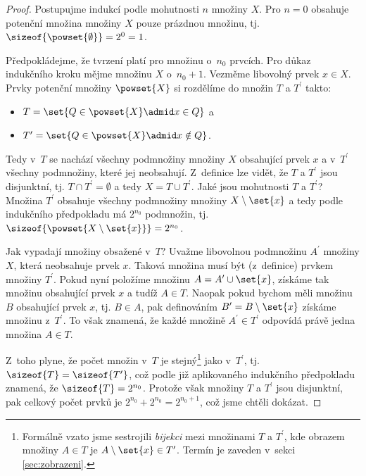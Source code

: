 \begin{proof}
    Postupujme indukcí podle mohutnosti $n$ množiny $X$. Pro $n=0$ obsahuje potenční množina množiny $X$ pouze prázdnou množinu, tj. $\sizeof{\powset{\emptyset}}=2^0=1$.\par
    Předpokládejme, že tvrzení platí pro množinu o~$n_0$ prvcích. Pro důkaz indukčního kroku mějme množinu $X$ o~$n_0+1$. Vezměme libovolný prvek $x \in X$. Prvky potenční množiny $\powset{X}$ si rozdělíme do množin $T$ a $T^\prime$ takto:
    \begin{itemize}
        \item $T=\set{Q \in \powset{X} \admid x\in Q}$ a
        \item $T^\prime=\set{Q \in \powset{X} \admid x\notin Q}$.
    \end{itemize}
    Tedy v~$T$ se nachází všechny podmnožiny množiny $X$ obsahující prvek $x$ a v~$T^\prime$ všechny podmnožiny, které jej neobsahují. Z~definice lze vidět, že $T$ a $T^\prime$ jsou disjunktní, tj. $T \cap T^\prime=\emptyset$ a tedy $X=T\cup T^\prime$. Jaké jsou mohutnosti $T$ a $T^\prime$? Množina $T^\prime$ obsahuje všechny podmnožiny množiny $X\setminus\set{x}$ a tedy podle indukčního předpokladu má $2^{n_0}$ podmnožin, tj. $\sizeof{\powset{X\setminus\set{x}}}=2^{n_0}$.\par
    Jak vypadají množiny obsažené v~$T$? Uvažme libovolnou podmnožinu $A^\prime$ množiny $X$, která neobsahuje prvek $x$. Taková množina musí být (z~definice) prvkem množiny $T^\prime$. Pokud nyní položíme množinu $A=A^\prime\cup \set{x}$, získáme tak množinu obsahující prvek $x$ a tudíž $A\in T$. Naopak pokud bychom měli množinu $B$ obsahující prvek $x$, tj. $B\in A$, pak definováním $B^\prime=B\setminus \set{x}$ získáme množinu z~$T^\prime$. To však znamená, že každé množině $A^\prime\in T^\prime$ odpovídá právě jedna množina $A\in T$.\par
    Z~toho plyne, že počet množin v~$T$ je stejný\footnote{Formálně vzato jsme sestrojili \emph{bijekci} mezi množinami $T$ a $T^\prime$, kde obrazem množiny $A\in T$ je $A\setminus \set{x}\in T^\prime$. Termín je zaveden v~sekci \ref{sec:zobrazeni}.} jako v~$T^\prime$, tj. $\sizeof{T}=\sizeof{T^\prime}$, což podle již aplikovaného indukčního předpokladu znamená, že $\sizeof{T}=2^{n_0}$. Protože však množiny $T$ a $T^\prime$ jsou disjunktní, pak celkový počet prvků je $2^{n_0}+2^{n_0}=2^{n_0+1}$, což jsme chtěli dokázat.
\end{proof}